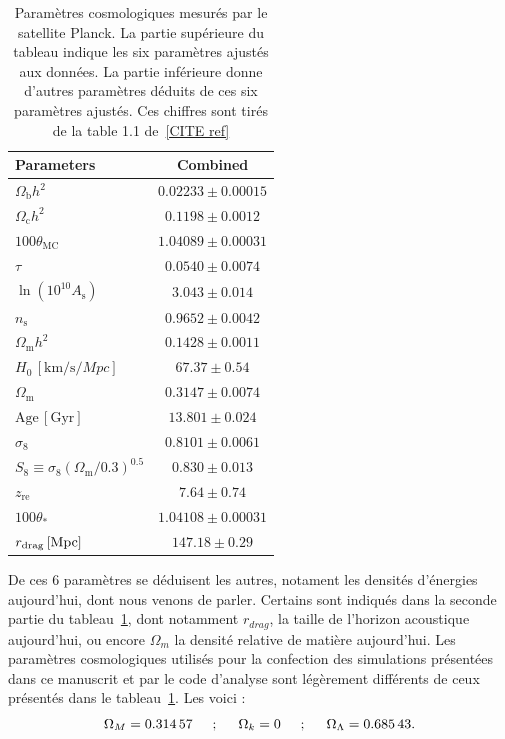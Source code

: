 \documentclass[11pt, twoside, a4paper, openright]{report}
\begin{document}
\begin{table}[h]
  \centering
  \caption{Paramètres cosmologiques mesurés par le satellite Planck. La partie supérieure du tableau indique les six paramètres ajustés aux données. La partie inférieure donne d'autres paramètres déduits de ces six paramètres ajustés. Ces chiffres sont tirés de la table 1.1 de~\ref{CITE ref}}
  \label{table:planck2018}
  \begin{tabular}{lc}
    \toprule
    Parameters & Combined \\
    \midrule
    $\Omega_{\mathrm{b}}h^2$\dotfill & $0.02233\pm0.00015$ \\
    $\Omega_{\mathrm{c}}h^2$\dotfill & $0.1198\pm0.0012$ \\
    $100\theta_{\mathrm{MC}}$\dotfill & $1.04089\pm0.00031$ \\
    $\tau$\dotfill & $0.0540\pm0.0074$ \\
    $\ln(10^{10}A_\mathrm{s})$\dotfill & $3.043\pm0.014$ \\
    $n_\mathrm{s}$\dotfill & $0.9652\pm0.0042$ \\
    \midrule
    $\Omega_{\mathrm{m}} h^2$\dotfill & $ 0.1428\pm 0.0011 $ \\
    $H_0 \,[\si{\kilo\meter\per\second\per Mpc}]$\dotfill & $67.37\pm0.54$ \\
    $\Omega_{\mathrm{m}}$\dotfill & $0.3147\pm0.0074$ \\
    $\mathrm{Age}\, [\mathrm{Gyr}]$\dotfill  & $13.801\pm0.024$ \\
    $\sigma_8$\dotfill & $0.8101\pm0.0061$ \\
    $S_8\equiv \sigma_8 (\Omega_{\mathrm{m}}/0.3)^{0.5}$\dotfill & $0.830\pm0.013$ \\
    $z_{\mathrm{re}}$\dotfill & $7.64\pm0.74$ \\
    $100\theta_\ast$\dotfill & $1.04108\pm0.00031$ \\
    $r_{\mathrm{drag}} \,[{\rm Mpc}]$\dotfill & $147.18\pm0.29$ \\
    \bottomrule
  \end{tabular}
\end{table}

De ces 6 paramètres se déduisent les autres, notament les densités d'énergies aujourd'hui, dont nous venons de parler. Certains sont indiqués dans la seconde partie du tableau~\ref{table:planck2018}, dont notamment $r_{drag}$, la taille de l'horizon acoustique aujourd'hui, ou encore $\Omega_m$ la densité relative de matière aujourd'hui. Les paramètres cosmologiques utilisés pour la confection des simulations présentées dans ce manuscrit et par le code d'analyse \picca{} sont légèrement différents de ceux présentés dans le tableau~\ref{table:planck2018}. Les voici :
\begin{equation}
  \label{eq:par_cosmo}
  \Omega_M = \num{0.31457} \hspace{0.5cm} ; \hspace{0.5cm} \Omega_k = \num{0} \hspace{0.5cm} ; \hspace{0.5cm} \Omega_{\Lambda} = \num{0.68543} .
\end{equation}
\end{document}
